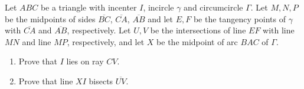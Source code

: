 \usepackage{enumitem}

Let $ABC$ be a triangle with incenter $I$, incircle $\gamma$ and circumcircle $\Gamma$.  Let $M,N,P$ be the midpoints of sides $\overline{BC}$, $\overline{CA}$, $\overline{AB}$ and let $E,F$ be the tangency points of $\gamma$ with $\overline{CA}$ and $\overline{AB}$, respectively.  Let $U,V$ be the intersections of line $EF$ with line $MN$ and line $MP$, respectively, and let $X$ be the midpoint of arc $BAC$ of $\Gamma$.

\begin{enumerate}[label=(\alph*)]
	\item Prove that $I$ lies on ray $CV$.
	\item Prove that line $XI$ bisects $\overline{UV}$.
\end{enumerate}